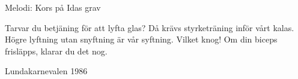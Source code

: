 \begin{song}

\begin{songmeta}
Melodi: Kors på Idas grav
\end{songmeta}

\begin{songtext}
Tarvar du betjäning för att lyfta glas?
Då krävs styrketräning inför vårt kalas.
Högre lyftning utan snyftning
är vår syftning. Vilket knog!
Om din biceps frisläpps,
klarar du det nog.
\end{songtext}

\begin{songnotes}
Lundakarnevalen 1986
\end{songnotes}

\end{song}
